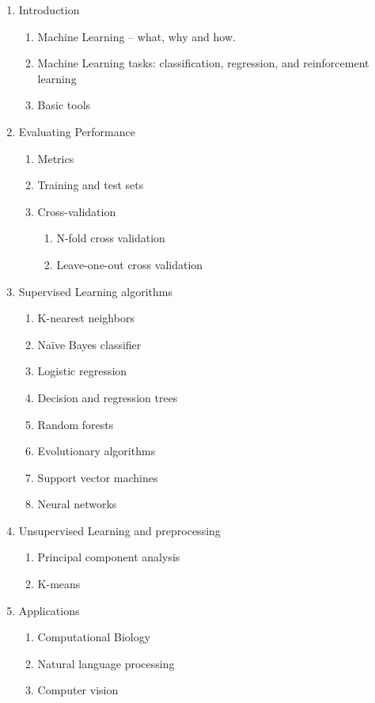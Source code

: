 \documentclass[12pt]{scrartcl}
\begin{document}
\begin{enumerate}
	\item Introduction
	\begin{enumerate} 
		\item Machine Learning – what, why and how. 
		\item Machine Learning tasks: classification, regression, and reinforcement learning 
		\item Basic tools
	\end{enumerate}
	\item Evaluating Performance
	\begin{enumerate} 
		\item Metrics 
		\item Training and test sets 
		\item Cross-validation 
		\begin{enumerate}
			\item N-fold cross validation 
			\item Leave-one-out cross validation
		\end{enumerate}
	\end{enumerate}
	\item Supervised Learning algorithms
	\begin{enumerate} 
		\item K-nearest neighbors 
		\item Naïve Bayes classifier 
		\item Logistic regression
		\item Decision and regression trees 
		\item Random forests 
		\item Evolutionary algorithms 
		\item Support vector machines 
		\item Neural networks
	\end{enumerate}
	\item Unsupervised Learning and preprocessing
	\begin{enumerate}
		\item Principal component analysis 
		\item K-means
	\end{enumerate}
	\item Applications
	\begin{enumerate}
		\item Computational Biology
		\item Natural language processing 
		\item Computer vision
	\end{enumerate}
\end{enumerate}
\end{document}
